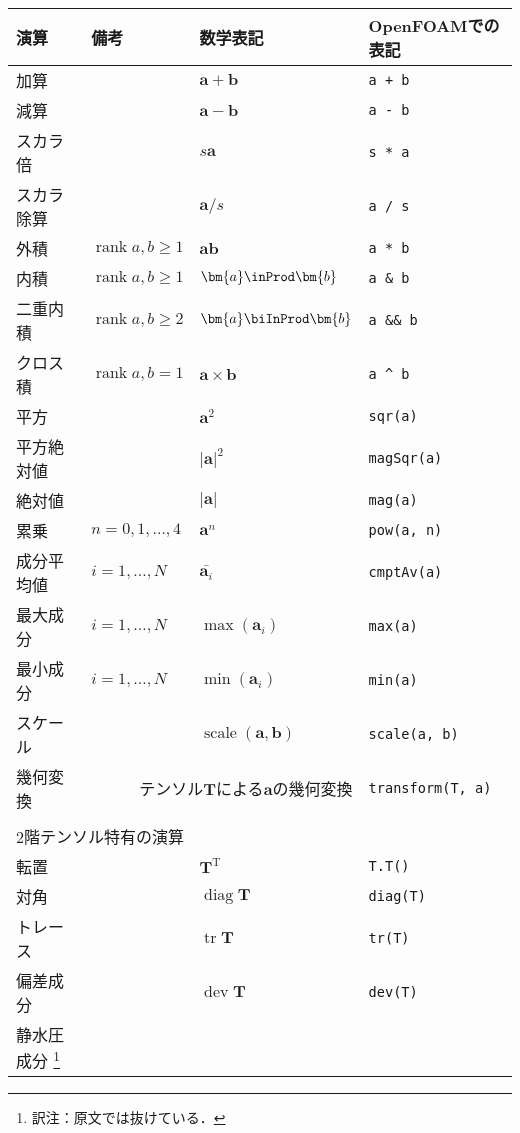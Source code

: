 \begin{longtable}{Xlll}
 演算 & 備考 & 数学表記 & OpenFOAMでの表記 \\
 \hline
 加算 &  & $\bm{a} + \bm{b}$ & \verb|a + b| \\
 減算 &  & $\bm{a} - \bm{b}$ & \verb|a - b| \\
 スカラ倍 &  & $s\bm{a}$ & \verb|s * a| \\
 スカラ除算 &  & $\bm{a}/s$ & \verb|a / s| \\
 外積 & $\mathop{\mathrm{rank}}a, b \ge 1$ & $\bm{a}\bm{b}$ & \verb|a * b| \\
 内積 & $\mathop{\mathrm{rank}}a, b \ge 1$ & $\bm{a} \inProd \bm{b}$ & \verb|a & b| \\
 二重内積 & $\mathop{\mathrm{rank}}a, b \ge 2$ & $\bm{a} \biInProd \bm{b}$ & \verb|a && b| \\
 クロス積 & $\mathop{\mathrm{rank}}a, b = 1$ & $\bm{a} \times \bm{b}$ & \verb|a ^ b| \\
 平方 &  & $\bm{a}^{2}$ & \verb|sqr(a)| \\
 平方絶対値 &  & $|\bm{a}|^{2}$ & \verb|magSqr(a)| \\
 絶対値 &  & $|\bm{a}|$ & \verb|mag(a)| \\
 累乗 & $n = 0, 1, \dots, 4$ & $\bm{a}^{n}$ & \verb|pow(a, n)| \\
 成分平均値 & $i = 1, \dots, N$ & $\bar{\bm{a}_{i}}$ & \verb|cmptAv(a)| \\
 最大成分 & $i = 1, \dots, N$ & $\max(\bm{a}_{i})$ & \verb|max(a)| \\
 最小成分 & $i = 1, \dots, N$ & $\min(\bm{a}_{i})$ & \verb|min(a)| \\
 スケール &  & $\mathop{\mathrm{scale}}(\bm{a}, \bm{b})$ & \verb|scale(a, b)| \\
 幾何変換 & \multicolumn{2}{r}{テンソル$\bm{T}$による$\bm{a}$の幾何変換} & \verb|transform(T, a)| \\
 \\
 \multicolumn{4}{l}{\sffamily\gtfamily 2階テンソル特有の演算} \\
 \hline
 転置 &  & $\bm{T}^{\mathrm{T}}$ & \verb|T.T()| \\
 対角 &  & $\mathop{\mathrm{diag}}\bm{T}$ & \verb|diag(T)| \\
 トレース &  & $\mathop{\mathrm{tr}}\bm{T}$ & \verb|tr(T)| \\
 偏差成分 &  & $\mathop{\mathrm{dev}}\bm{T}$ & \verb|dev(T)| \\
 静水圧成分%
\footnote{訳注：原文では抜けている．}%

\end{longtable}
